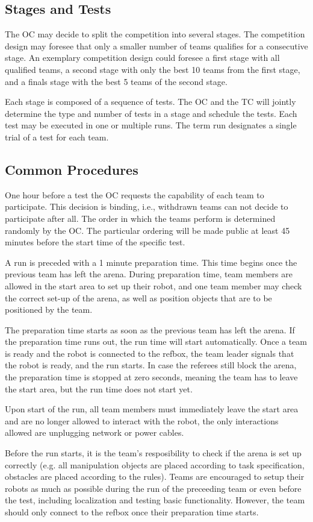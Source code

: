 \subsection{Stages and Tests}
The OC may decide to split the competition into several stages. The competition design may foresee that only a smaller number of teams qualifies for a consecutive stage. An exemplary competition design could foresee a first stage with all qualified teams, a second stage with only the best 10 teams from the first stage, and a finals stage with the best 5 teams of the second stage.
\par
Each stage is composed of a sequence of tests. The OC and the TC will jointly determine the type and number of tests in a stage and schedule the tests.
Each test may be executed in one or multiple runs. The term run designates a single trial of a test for each team.


\subsection{Common Procedures}
One hour before a test the OC requests the capability of each team to participate.
This decision is binding, i.e., withdrawn teams can not decide to participate after all.
The order in which the teams perform is determined randomly by the OC.
The particular ordering will be made public at least 45 minutes before the start time of the specific test.

\par
A run is preceded with a 1 minute preparation time. This time begins once the previous team has left the arena.
During preparation time, team members are allowed in the start area to set up their robot, and one team member may check the correct set-up of the arena, as well as position objects that are to be positioned by the team. %
\par
The preparation time starts as soon as the previous team has left the arena. If the preparation time runs out, the run time will start automatically.
Once a team is ready and the robot is connected to the refbox, the team leader signals that the robot is ready, and the run starts.
In case the referees still block the arena, the preparation time is stopped at zero seconds, meaning the team has to leave the start area, but the run time does not start yet.
\par
Upon start of the run, all team members must immediately leave the start area and are no longer allowed to interact with the robot, the only interactions allowed are unplugging network or power cables.
\par
Before the run starts, it is the team's resposibility to check if the arena is set up correctly (e.g. all manipulation objects are placed according to task specification, obstacles are placed according to the rules).
Teams are encouraged to setup their robots as much as possible during the run of the preceeding team or even before the test, including localization and testing basic functionality. However, the team should only connect to the refbox once their preparation time starts.
\par

